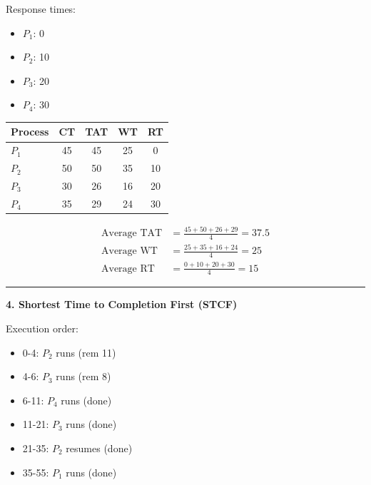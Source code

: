 \documentclass[a4paper, 10pt]{article}
\begin{document}
\begin{examplebox}{}{}
\begin{minipage}[t]{0.48\textwidth}
        Response times:
        \begin{itemize}
            \item $P_1$: 0
            \item $P_2$: 10
            \item $P_3$: 20
            \item $P_4$: 30
        \end{itemize}
    \end{minipage}
    \hfill
    \begin{minipage}[t]{0.48\textwidth}
        \begin{center}
            \begin{tabular}{@{} l c c c c @{}}
                \toprule
                Process & CT & TAT & WT & RT \\
                \midrule
                $P_1$   & 45 & 45  & 25 & 0  \\
                $P_2$   & 50 & 50  & 35 & 10 \\
                $P_3$   & 30 & 26  & 16 & 20 \\
                $P_4$   & 35 & 29  & 24 & 30 \\
                \bottomrule
            \end{tabular}
        \end{center}

        \begin{align*}
            \text{Average TAT} & = \frac{45 + 50 + 26 + 29}{4} = 37.5 \\
            \text{Average WT}  & = \frac{25 + 35 + 16 + 24}{4} = 25   \\
            \text{Average RT}  & = \frac{0 + 10 + 20 + 30}{4} = 15
        \end{align*}
    \end{minipage}

    \rule{\textwidth}{0.5pt}

    \textbf{4. Shortest Time to Completion First (STCF)}

    \begin{minipage}[t]{0.48\textwidth}
        Execution order:
        \begin{itemize}
            \item 0-4: $P_2$ runs (rem 11)
            \item 4-6: $P_3$ runs (rem 8)
            \item 6-11: $P_4$ runs (done)
            \item 11-21: $P_3$ runs (done)
            \item 21-35: $P_2$ resumes (done)
            \item 35-55: $P_1$ runs (done)
        \end{itemize}


\end{minipage}
\end{examplebox}
\end{document}
